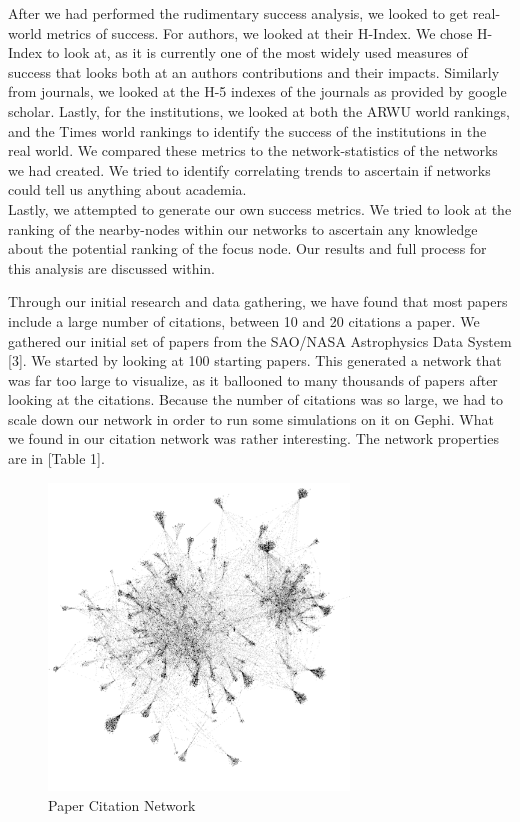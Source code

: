 \documentclass[times, 10pt,twocolumn]{article}
\begin{document}
After we had performed the rudimentary success analysis, we looked to get real-world metrics of success. For authors, we looked at their H-Index. We chose H-Index to look at, as it is currently one of the most widely used measures of success that looks both at an authors contributions and their impacts. Similarly from journals, we looked at the H-5 indexes of the journals as provided by google scholar. Lastly, for the institutions, we looked at both the ARWU world rankings, and the Times world rankings to identify the success of the institutions in the real world. We compared these metrics to the network-statistics of the networks we had created. We tried to identify correlating trends to ascertain if networks could tell us anything about academia. \\

Lastly, we attempted to generate our own success metrics. We tried to look at the ranking of the nearby-nodes within our networks to ascertain any knowledge about the potential ranking of the focus node. Our results and full process for this analysis are discussed within.

Through our initial research and data gathering, we have found that most papers include a large number of citations, between 10 and 20 citations a paper. We gathered our initial set of papers from the SAO/NASA Astrophysics Data System [3]. We started by looking at 100  starting papers. This generated a network that was far too large to visualize, as it ballooned to many thousands of papers after looking at the citations. Because the number of citations was so large, we had to scale down our network in order to run some simulations on it on Gephi. What we found in our citation network was rather interesting. The network properties are in [Table 1].

\begin{figure}[h]
   \includegraphics[width=8cm]{figure1.png}
   \caption{Paper Citation Network}
\end{figure}
\end{document}
